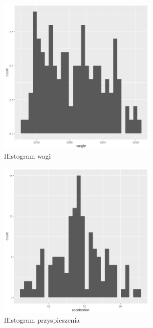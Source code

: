 \documentclass{article}
\begin{document}
            \begin{figure}[H]
                \caption{Histogram wagi}
                \centering
                \includegraphics[width=0.7\textwidth]{../histograms/weight_hist.jpeg}
            \end{figure}
            \begin{figure}[H]
                \caption{Histogram przyspieszenia}
                \centering
                \includegraphics[width=0.7\textwidth]{../histograms/acceleration_hist.jpeg}
            \end{figure}
\end{document}
